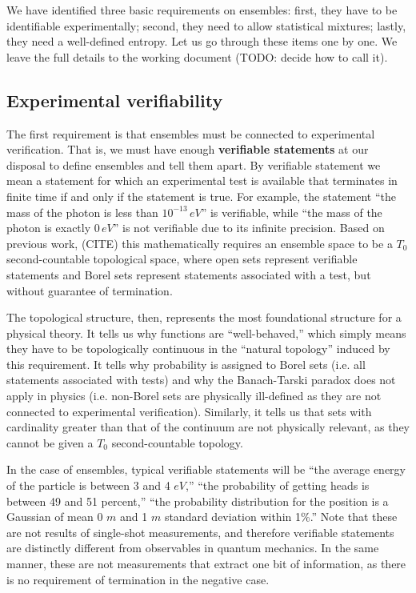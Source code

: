 \documentclass[10pt,twocolumn, nofootinbib]{revtex4-2}
\begin{document}
We have identified three basic requirements on ensembles: first, they have to be identifiable experimentally; second, they need to allow statistical mixtures; lastly, they need a well-defined entropy. Let us go through these items one by one. We leave the full details to the working document (TODO: decide how to call it).

\subsection{Experimental verifiability}
The first requirement is that ensembles must be connected to experimental verification. That is, we must have enough \textbf{verifiable statements} at our disposal to define ensembles and tell them apart. By verifiable statement we mean a statement for which an experimental test is available that terminates in finite time if and only if the statement is true. For example, the statement ``the mass of the photon is less than $10^{-13} \, eV$'' is verifiable, while ``the mass of the photon is exactly $0 \, eV$'' is not verifiable due to its infinite precision. Based on previous work, (CITE) this mathematically requires an ensemble space to be a $T_0$ second-countable topological space, where open sets represent verifiable statements and Borel sets represent statements associated with a test, but without guarantee of termination.

The topological structure, then, represents the most foundational structure for a physical theory. It tells us why functions are ``well-behaved,'' which simply means they have to be topologically continuous in the ``natural topology'' induced by this requirement. It tells why probability is assigned to Borel sets (i.e. all statements associated with tests) and why the Banach-Tarski paradox does not apply in physics (i.e. non-Borel sets are physically ill-defined as they are not connected to experimental verification). Similarly, it tells us that sets with cardinality greater than that of the continuum are not physically relevant, as they cannot be given a $T_0$ second-countable topology.

In the case of ensembles, typical verifiable statements will be ``the average energy of the particle is between 3 and 4 $eV$,'' ``the probability of getting heads is between 49 and 51 percent,'' ``the probability distribution for the position is a Gaussian of mean 0 $m$ and 1 $m$ standard deviation within 1\%.'' Note that these are not results of single-shot measurements, and therefore verifiable statements are distinctly different from observables in quantum mechanics. In the same manner, these are not measurements that extract one bit of information, as there is no requirement of termination in the negative case.
\end{document}
